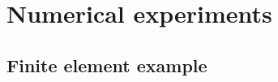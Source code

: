 \section{Numerical experiments}\label{sec:exp}
\subsection{Finite element example}\label{sec:FEexp}
